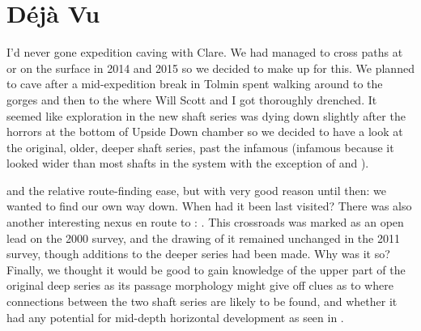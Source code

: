 \section{Déjà Vu}
\begin{marginfigure}
\end{marginfigure}

I’d never gone expedition caving with Clare. We had managed to cross paths at  or on the surface in 2014 and 2015 so we decided to make up for this. We planned to cave after a mid-expedition break in Tolmin spent walking around to the  gorges and then to the  where Will Scott and I got thoroughly drenched. It seemed like exploration in the new shaft series was dying down slightly after the horrors at the bottom of Upside Down chamber so we decided to have a look at the original, older, deeper shaft series, past the infamous  (infamous because it looked wider than most shafts in the system with the exception of  and ).

 and the relative route-finding ease, but with very good reason until then: we wanted to find our own way down. When had it been last visited? There was also another interesting nexus en route to : . This crossroads was marked as an open lead on the 2000 survey, and the drawing of it remained unchanged in the 2011 survey, though additions to the deeper series had been made. Why was it so? Finally, we thought it would be good to gain knowledge of the upper part of the original deep series as its passage morphology might give off clues as to where connections between the two shaft series are likely to be found, and whether it had any potential for mid-depth horizontal development as seen in . 

